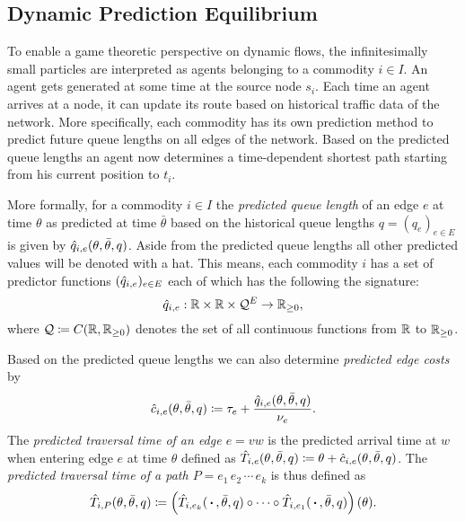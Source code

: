 \subsection{Dynamic Prediction Equilibrium}\label{subsec-dynamic-prediction-equilibrium}

To enable a game theoretic perspective on dynamic flows, the infinitesimally small particles are interpreted as agents belonging to a commodity $i\in I$.
An agent gets generated at some time at the source node $s_i$.
Each time an agent arrives at a node, it can update its route based on historical traffic data of the network.
More specifically, each commodity has its own prediction method to predict future queue lengths on all edges of the network.
Based on the predicted queue lengths an agent now determines a time-dependent shortest path starting from his current position to $t_i$.

More formally, for a commodity $i\in I$ the \emph{predicted queue length} of an edge $e$ at time $\theta$ as predicted at time $\bar\theta$ based on the historical queue lengths $q=(q_e)_{e\in E}$ is given by $\hat q_{i,e}(\theta, \bar\theta, q)$.
Aside from the predicted queue lengths all other predicted values will be denoted with a hat. 
This means, each commodity $i$ has a set of predictor functions $(\hat q_{i,e})_{e\in E}$ each of which has the following the signature:
\[
    \hat q_{i,e} : \mathbb{R} \times \mathbb{R} \times \mathcal{Q}^E \rightarrow \mathbb{R}_{\geq0},
\]
where $\mathcal{Q}\coloneqq {C}{\left({\mathbb{R}},{\mathbb{R}_{\geq0}}\right)}$ denotes the set of all continuous functions from $\mathbb{R}$ to $\mathbb{R}_{\geq0}$.

Based on the predicted queue lengths we can also determine \emph{predicted edge costs} by \[
    \hat c_{i,e}(\theta, \bar\theta, q) \coloneqq \tau_e + \frac{\hat q_{i,e}(\theta, \bar\theta, q)}{\nu_e}.
\]
The \emph{predicted traversal time of an edge $e=vw$} is the predicted arrival time at $w$ when entering edge $e$ at time $\theta$ defined as $\hat T_{i,e}(\theta, \bar\theta, q) \coloneqq \theta + \hat c_{i,e}(\theta, \bar\theta, q)$.
The \emph{predicted traversal time of a path $P=e_1\,e_2\,\cdots\,e_k$} is thus defined as \[
    \hat T_{i,P}(\theta,\bar\theta, q) \coloneqq \left(
        \hat T_{i,e_k}(\,\boldsymbol{\cdot}\,, \bar\theta, q) \circ \cdots \circ \hat T_{i,e_1}(\,\boldsymbol{\cdot}\,, \bar\theta, q)
    \right) (\theta).
\]

